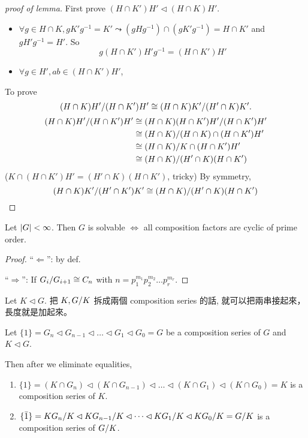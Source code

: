 \begin{proof}[proof of lemma]
  First prove $(H\cap K')H' \lhd (H\cap K)H'$.
  \begin{itemize}
    \item $\forall g \in H \cap K, g K'g^{-1} = K' \leadsto
      (gHg^{-1}) \cap (gK'g^{-1}) = H \cap K'$ and $gH'g^{-1} = H'$. So
      \[ g(H\cap K')H'g^{-1} = (H\cap K')H' \]
    \item $\forall g \in H', ab \in (H\cap K')H'$, 
  \end{itemize}

  To prove
  \[
    {(H\cap K)H'}/{(H\cap K')H'} \cong {(H\cap K)K'}/{(H'\cap K)K'}.
  \]
  \begin{align*}
    {(H\cap K)H'}/{(H\cap K')H'} &\cong
    {(H\cap K)(H\cap K')H'}/{(H\cap K')H'} \\
    &\cong {(H\cap K)}/{(H\cap K)\cap(H\cap K')H'} \\
    &\cong {(H\cap K)}/{K\cap(H\cap K')H'} \\
    &\cong {(H\cap K)}/{(H'\cap K)(H\cap K')}
  \end{align*}
  ($K\cap(H\cap K')H' = (H'\cap K)(H\cap K')$, tricky)
  By symmetry, 
  \[
    {(H\cap K)K'}/{(H'\cap K')K'} \cong
    {(H\cap K)}/{(H'\cap K)(H\cap K')}
  \]
\end{proof}

\begin{prop}
  Let $\lvert G\rvert < \infty$. Then $G$ is solvable $\iff$ all composition factors
  are cyclic of prime order.
  \begin{proof}
    ``$\Leftarrow$'': by def.

    ``$\Rightarrow$'': If ${G_i}/{G_{i+1}} \cong C_n$ with
    $n = p_1^{m_1} p_2^{m_2} \dots p_r^{m_r}$.
  \end{proof}
\end{prop}

\begin{observation*}
  Let $K \lhd G$. 把 $K, {G}/{K}$ 拆成兩個 composition series 的話,
  就可以把兩串接起來，長度就是加起來。
\end{observation*}

\begin{exercise}
  Let $\{1\} = G_n \lhd G_{n-1} \lhd \dots \lhd G_1 \lhd G_0 = G$ be a
  composition series of $G$ and $K \lhd G$.

  Then after we eliminate equalities,
  \begin{enumerate}
    \item $\{1\} = (K \cap G_n) \lhd (K \cap G_{n-1}) \lhd \dots \lhd
      (K \cap G_1) \lhd (K \cap G_0) = K$ is a composition series of $K$.
    \item $\{\bar{1}\} = {KG_n}/{K} \lhd {KG_{n-1}}/{K} \lhd \dots \lhd
      {KG_1}/{K} \lhd {KG_0}/{K} = {G}/{K}$ is a composition
      series of ${G}/{K}$.
  \end{enumerate}
\end{exercise}

